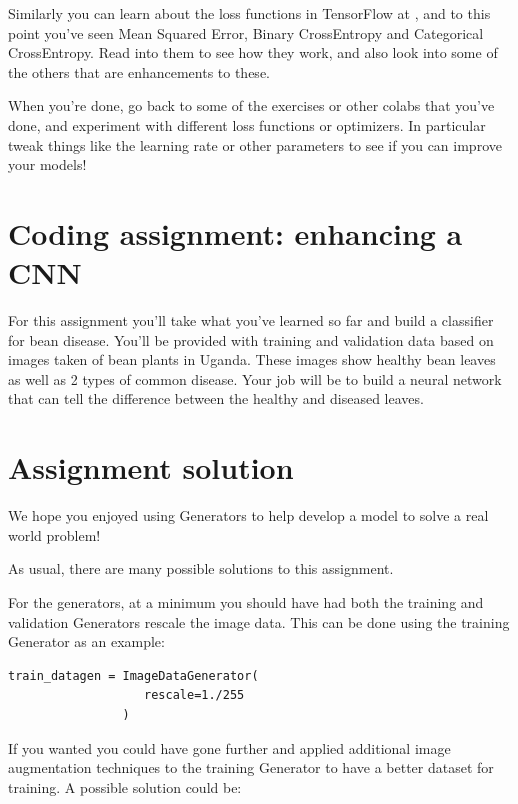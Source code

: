 Similarly you can learn about the loss functions in TensorFlow at , and to this point you’ve seen Mean Squared Error, Binary CrossEntropy and Categorical CrossEntropy. Read into them to see how they work, and also look into some of the others that are enhancements to these.

When you're done, go back to some of the exercises or other colabs that you’ve done, and experiment with different loss functions or optimizers. In particular tweak things like the learning rate or other parameters to see if you can improve your models!

\section{Coding assignment: enhancing a CNN}


For this assignment you'll take what you've learned so far and build a classifier for bean disease. You'll be provided with training and validation data based on images taken of bean plants in Uganda. These images show healthy bean leaves as well as 2 types of common disease. Your job will be to build a neural network that can tell the difference between the healthy and diseased leaves.



\section{Assignment solution}

We hope you enjoyed using Generators to help develop a model to solve a real world problem!

As usual, there are many possible solutions to this assignment.

For the generators, at a minimum you should have had both the training and validation Generators rescale the image data. This can be done using the training Generator as an example:

\begin{lstlisting}
train_datagen = ImageDataGenerator(
                   rescale=1./255
                )
\end{lstlisting}

If you wanted you could have gone further and applied additional image augmentation techniques to the training Generator to have a better dataset for training. A possible solution could be:

